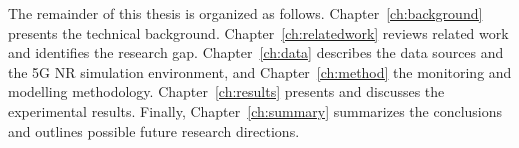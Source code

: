 The remainder of this thesis is organized as follows. Chapter~\ref{ch:background} presents the technical background. Chapter~\ref{ch:relatedwork} reviews related work and identifies the research gap. Chapter~\ref{ch:data} describes the data sources and the 5G NR simulation environment, and Chapter~\ref{ch:method} the monitoring and modelling methodology. Chapter~\ref{ch:results} presents and discusses the experimental results. Finally, Chapter~\ref{ch:summary} summarizes the conclusions and outlines possible future research directions.